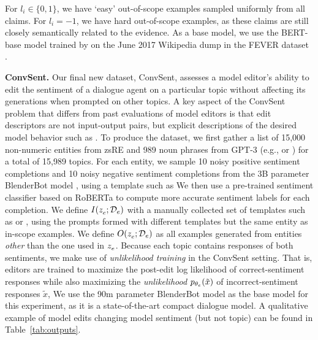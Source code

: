 \documentclass{article}
\begin{document}
For $l_i \in \{0,1\}$, we have `easy' out-of-scope examples sampled uniformly from all claims. For $l_i=-1$, we have hard out-of-scope examples, as these claims are still closely semantically related to the evidence. As a base model, we use the BERT-base model trained by \citet{Cao2021EditingFK} on the June 2017 Wikipedia dump in the FEVER dataset \citep{Thorne18Fever}.

% 

\textbf{ConvSent.} Our final new dataset, ConvSent, assesses a model editor's ability to edit the sentiment of a dialogue agent on a particular topic without affecting its generations when prompted on other topics. A key aspect of the ConvSent problem that differs from past evaluations of model editors is that edit descriptors are not input-output pairs, but explicit descriptions of the desired model behavior such as . To produce the dataset, we first gather a list of 15,000 non-numeric entities from zsRE \citep{levy2017zero,Cao2021EditingFK} and 989 noun phrases from GPT-3 \citep{brown2020language} (e.g.,  or ) for a total of 15,989 topics. For each entity, we sample 10 noisy positive sentiment completions and 10 noisy negative sentiment completions from the 3B parameter BlenderBot model \citep{roller2021recipes}, using a template such as  We then use a pre-trained sentiment classifier \citep{heitmann2020} based on RoBERTa \citep{liu2019robustly} to compute more accurate sentiment labels for each completion. We define $I(z_e^{}; \mathcal{D}_{e})$ with a manually collected set of templates such as  or , using the prompts formed with different templates but the same entity as in-scope examples. We define $O(z_e^{}; \mathcal{D}_{e})$ as all examples generated from entities \textit{other} than the one used in $z_e^{}$. Because each topic contains responses of both sentiments, we make use of \textit{unlikelihood training} \citep{li2020dont} in the ConvSent setting. That is, editors are trained to maximize the post-edit log likelihood of correct-sentiment responses while also maximizing the \textit{unlikelihood} $p_{\theta_e}(\tilde x)$ of incorrect-sentiment responses $\tilde x$, We use the 90m parameter BlenderBot model \citep{roller2021recipes} as the base model for this experiment, as it is a state-of-the-art compact dialogue model. A qualitative example of model edits changing model sentiment (but not topic) can be found in Table~\ref{tab:outputs}.
\end{document}
